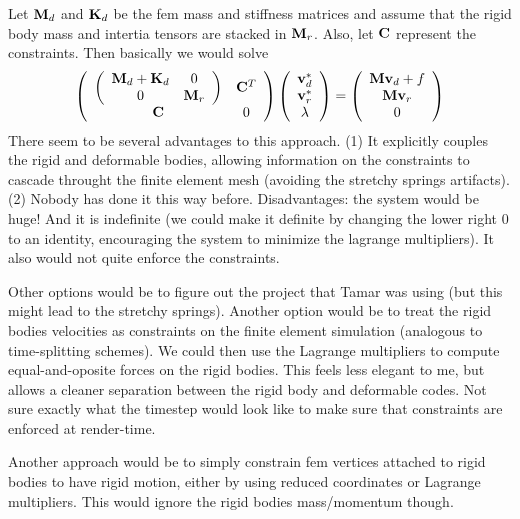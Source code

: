\documentclass[review]{acmsiggraph-job}
\begin{document}
Let $\mathit{\mathbf{M}}_{d}$ and $\mathit{\mathbf{K}}_{d}$ be the fem mass and stiffness matrices and assume that the rigid body 
mass and intertia tensors are stacked in $\mathit{\mathbf{M}}_r$.  Also, let $\mathit{\mathbf{C}}$ represent the constraints.  Then basically
we would solve 
\begin{equation}
\left(\begin{array}{cc}
\left(
\begin{array}{cc}
\mathit{\mathbf{M}}_d+\mathit{\mathbf{K}}_d & 0 \\
0 & \mathit{\mathbf{M}}_r 
\end{array}
\right)
& \mathit{\mathbf{C}}^T\\
\mathit{\mathbf{C}} & 0
\end{array}
\right)\left(
\begin{array}{c}
\mathit{\mathbf{v}}_d^*\\
\mathit{\mathbf{v}}_r^*\\
\mathit{\mathbf{\lambda}}
\end{array}
\right) =
\left(
\begin{array}{c}
\mathit{\mathbf{Mv}}_d + f\\
\mathit{\mathbf{Mv}}_r\\
0
\end{array}
\right)
\end{equation}
There seem to be several advantages to this approach. (1) It explicitly couples the rigid and deformable bodies, allowing
information on the constraints to cascade throught the finite element mesh (avoiding the stretchy springs artifacts).  
(2) Nobody has done it this way before.  Disadvantages: the system would be huge!  And it is indefinite (we could make
it definite by changing the lower right 0 to an identity, encouraging the system to minimize the lagrange multipliers).  
It also would not quite enforce the constraints.

Other options would be to figure out the project that Tamar was using (but this might lead to the stretchy springs).  
Another option would be to treat the rigid bodies velocities as constraints on the finite element simulation (analogous to time-splitting schemes).
We could then use the Lagrange multipliers to compute equal-and-oposite forces on the rigid bodies.  This feels less elegant to 
me, but allows a cleaner separation between the rigid body and deformable codes.  Not sure exactly what the timestep would look like to make
sure that constraints are enforced at render-time.

Another approach would be to simply constrain fem vertices attached to rigid bodies to have rigid motion, either by using reduced coordinates
or Lagrange multipliers.  This would ignore the rigid bodies mass/momentum though.
\end{document}
